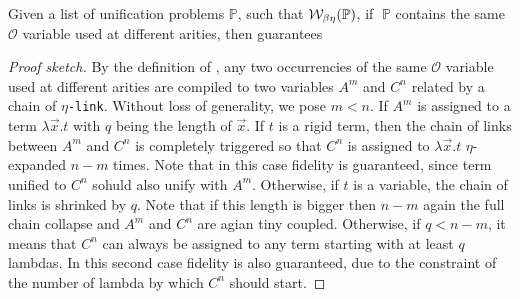 \documentclass[sigconf,natbib=false,review]{acmart}
\newcommand{\appsep}{\ensuremath{\textcolor{lightgray}{\cdot}}}
\newcommand{\linkMacro}[1]{\ensuremath{#1}\texttt{-link}\xspace}
\newcommand{\linketa} {\linkMacro{\eta}}
\newcommand{\Fo}{\texorpdfstring{\ensuremath{\mathcal{O}\xspace}}{O}} %
\newcommand{\foUnifPb}{\ensuremath{\mathbb{P}}\xspace}
\begin{document}
\begin{theorem}
  Given a list of unification problems \foUnifPb, such that 
  $\wellb_{\beta \eta}(\foUnifPb)$,
  if $\;\foUnifPb$ contains the same \Fo{} variable used at different arities,
  then \mapdeduplication guarantees 
\end{theorem}

\begin{proof}[Proof sketch]
  By the definition of \mapdeduplication, any two occurrencies of the same \Fo{} 
  variable used at different arities are compiled to two
  variables $A^m$ and $C^n$ related by a chain of \linketa.
%
  Without loss of generality, we pose $m < n$. If $A^m$ is assigned to a term
  $\lambda \vec{x}.t$ with $q$ being the length of $\vec{x}$. If $t$ is a rigid
  term, then the chain of links between $A^m$ and $C^n$ is completely triggered
  so that $C^n$ is assigned to $\lambda \vec{x}.t$ $\eta$-expanded $n-m$ times.
  Note that in this case fidelity is guaranteed, since term unified to $C^n$
  sohuld also unify with $A^m$. Otherwise, if $t$ is a variable, the chain of
  links is shrinked by $q$. Note that if this length is bigger then $n-m$ again
  the full chain collapse and $A^m$ and $C^n$ are agian tiny coupled. Otherwise,
  if $q < n-m$, it means that $C^n$ can always be assigned to any term starting
  with at least $q$ lambdas. In this second case fidelity is also guaranteed,
  due to the constraint of the number of lambda by which $C^n$ should start.
%
%
%
\end{proof}
\end{document}
